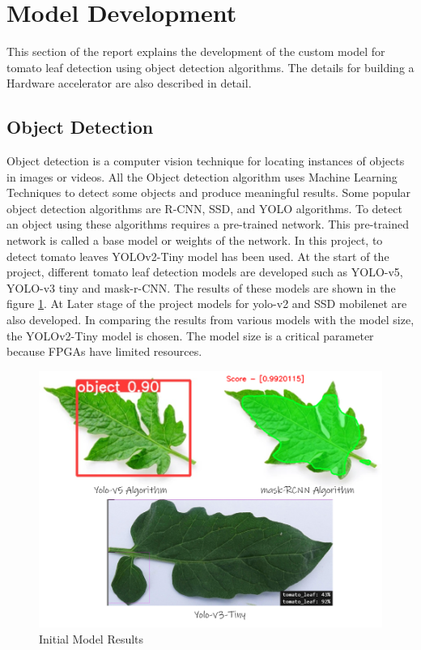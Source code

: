 \documentclass[a4paper,12pt,oneside]{book}
\begin{document}
\section{Model Development}
This section of the report explains the development of the custom model for tomato leaf detection using object detection algorithms. The details for building a Hardware accelerator are also described in detail.

\subsection*{Object Detection}
Object detection is a computer vision technique for locating instances of objects in images or videos. All the Object detection algorithm uses Machine Learning Techniques to detect some objects and produce meaningful results. Some popular object detection algorithms are R-CNN, SSD, and YOLO algorithms. To detect an object using these algorithms requires a pre-trained network. This pre-trained network is called a base model or weights of the network. In this project, to detect tomato leaves YOLOv2-Tiny model has been used. At the start of the project, different tomato leaf detection models are developed such as YOLO-v5, YOLO-v3 tiny and mask-r-CNN. The results of these models are shown in the figure \ref{figure:detectionresults}. At Later stage of the project models for yolo-v2 and SSD mobilenet are also developed. In comparing the results from various models with the model size, the YOLOv2-Tiny model is chosen. The model size is a critical parameter because FPGAs have limited resources.
\begin{figure}[h!]
    \centering
    \includegraphics[scale=0.325]{images/models.png}
    \caption{Initial Model Results}
    \label{figure:detectionresults}
\end{figure}
\end{document}
